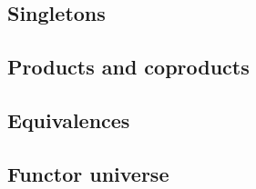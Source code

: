\documentclass[a4paper]{article}
\theoremstyle{definition}
\theoremstyle{remark}
\begin{document}
\subsection{Singletons}

\subsection{Products and coproducts}

\subsection{Equivalences}

\subsection{Functor universe}

\end{document}
